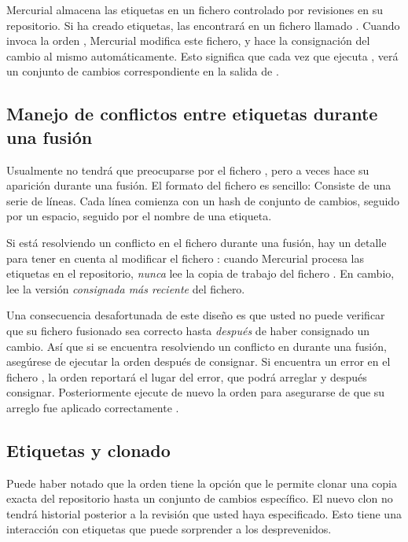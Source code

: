 Mercurial almacena las etiquetas en un fichero controlado por revisiones en
su repositorio. Si ha creado etiquetas, las encontrará en un fichero
llamado .  Cuando invoca la orden ,
Mercurial modifica este fichero, y hace la consignación del cambio al
mismo automáticamente.  Esto significa que cada vez que ejecuta
, verá un conjunto de cambios correspondiente en la salida
de .

\subsection{Manejo de conflictos entre etiquetas durante una fusión}

Usualmente no tendrá que preocuparse por el fichero ,
pero a veces hace su aparición durante una fusión. El formato del
fichero es sencillo: Consiste de una serie de líneas. Cada línea
comienza con un hash de conjunto de cambios, seguido por un espacio,
seguido por el nombre de una etiqueta.

Si está resolviendo un conflicto en el fichero 
durante una fusión, hay un detalle para tener en cuenta al modificar
el fichero :
cuando Mercurial procesa las etiquetas en el repositorio, \emph{nunca}
lee la copia de trabajo del fichero .  En cambio,
lee la versión \emph{consignada más reciente} del fichero.

Una consecuencia desafortunada de este diseño es que usted no puede
verificar que su fichero  fusionado sea correcto hasta
\emph{después} de haber consignado un cambio. Así que si se
encuentra resolviendo un conflicto en  durante una
fusión, asegúrese de ejecutar la orden  después de
consignar. Si encuentra un error en el fichero , 
la orden reportará el lugar del error, que podrá arreglar y después
consignar. Posteriormente ejecute de nuevo la orden  para
asegurarse de que su arreglo fue aplicado correctamente .

\subsection{Etiquetas y clonado}

Puede haber notado que la orden  tiene la opción
 que le permite clonar una copia exacta del
repositorio hasta un conjunto de cambios específico. El nuevo clon no
tendrá historial posterior a la revisión que usted haya
especificado. Esto tiene una interacción con etiquetas que puede
sorprender a los desprevenidos.

